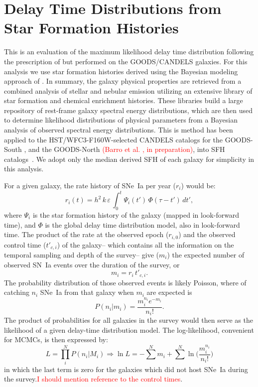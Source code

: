 \documentclass[apj]{aastex62}
\begin{document}
\section{Delay Time Distributions from Star Formation Histories}\label{sec:sfh}
This is an evaluation of the maximum likelihood delay time distribution following the prescription of \cite{Maoz:2012a} but performed on the GOODS/CANDELS galaxies. For this analysis we use star formation histories derived using the Bayesian modeling approach of \cite{Pacifici:2012ve}. In summary, the galaxy physical properties are retrieved from a combined analysis of stellar and nebular emission utilizing an extensive library of star formation and chemical enrichment histories. These libraries build a large repository of rest-frame galaxy spectral energy distributions, which are then used to determine likelihood distributions of physical parameters from a Bayesian analysis of observed spectral energy distributions. This is method has been applied to the HST/WFC3-F160W-selected CANDELS catalogs for the GOODS-South \citep{Guo:2013rp}, and the GOODS-North \textcolor{red}{(Barro et al. , in preparation)}, into SFH catalogs~\cite[cf. ][]{Pacifici:2016ul}. We adopt only the median derived SFH of each galaxy for simplicity in this analysis.

For a given galaxy, the rate history of SNe~Ia per year ($r_i$) would be:
\begin{equation}
r_i (t) = h^2\,k\,\varepsilon\, \int_0^t \Psi_i(t')\,\Phi(\tau-t')\,dt',
\label{eqn:rate_history}
\end{equation}
\noindent where $\Psi_i$ is the star formation history of the galaxy (mapped in look-forward time), and $\Phi$ is the global delay time distribution model, also in look-forward time. The product of the rate at the observed epoch ($r_{i,0}$) and the observed control time ($t'_{c, i}$) of the galaxy-- which contains all the information on the temporal sampling and depth of the survey--  give ($m_i$) the expected number of observed SN~Ia events over the duration of the survey, or
\begin{equation}
m_i = r_i \, t'_{c, i}.
\end{equation}
\noindent The probability distribution of those observed events is likely Poisson, where of catching $n_i$ SNe~Ia from that galaxy when $m_i$ are expected is
\begin{equation}
P(n_i | m_i) = \frac{m_i^{n_i}e^{-m_i}}{n_i!}.
\end{equation}
\noindent The product of probabilities for all galaxies in the survey would then serve as the likelihood of a given delay-time distribution model. The log-likelihood, convenient for MCMCs, is then expressed by:
\begin{equation}
L = \prod _i^N P(n_i|M_i) \Rightarrow \ln L = -\sum^N m_i+\sum^N\ln\biggl(\frac{m_i^{n_i}}{n_i!}\biggr)
\end{equation}
\noindent in which the last term is zero for the galaxies which did not host SNe~Ia during the survey.\textcolor{red}{I should mention reference to the control times}.
\end{document}
